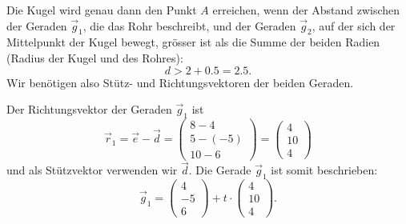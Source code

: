 \begin{loesung}
Die Kugel wird genau dann den Punkt $A$ erreichen, wenn der Abstand zwischen
der Geraden $\vec g_1$, die das Rohr beschreibt, und der Geraden $\vec g_2$, 
auf der sich der Mittelpunkt der Kugel bewegt, grösser ist als die Summe der 
beiden Radien (Radius der Kugel und des Rohres):
\[
  d > 2+0.5 = 2.5.
\]
Wir benötigen also Stütz- und Richtungsvektoren der beiden Geraden.

Der Richtungsvektor der Geraden $\vec g_1$ ist
\[
  \vec r_1 = \vec e - \vec d =
  \begin{pmatrix}
   8-4\\ 
   5-(-5)\\
   10-6
  \end{pmatrix}
  =  \begin{pmatrix}
   4\\ 
   10\\
   4
  \end{pmatrix}
\]
und als Stützvektor verwenden wir $\vec d$. Die Gerade $\vec g_1$ 
ist somit beschrieben:
\[
  \vec g_1 = 
  \begin{pmatrix}
   4\\ 
   -5\\
   6
  \end{pmatrix}
  + t\cdot 
  \begin{pmatrix}
   4\\ 
   10\\
   4
  \end{pmatrix}.
\]


\end{loesung}
